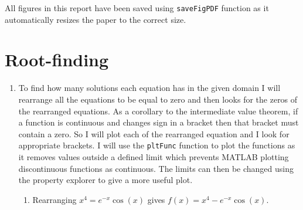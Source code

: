 \documentclass[a4paper,11pt]{article}
\begin{document}

All figures in this report have been saved using \verb*|saveFigPDF| function 
as it automatically resizes the paper to the correct size.


\section{Root-finding}
\begin{enumerate}
	\item To find how many solutions each equation has in the given domain I 
	will rearrange all the equations to be equal to zero and then looks for 
	the zeros of the rearranged equations. As a corollary to the intermediate 
	value theorem, if a function is continuous and changes sign in a bracket 
	then that bracket must contain a zero. So I will plot each of the 
	rearranged equation and I look for appropriate brackets. I will use the 
	\verb*|pltFunc| function to plot the functions as it removes values 
	outside a defined limit which prevents MATLAB plotting discontinuous 
	functions as continuous. The limits can then be changed using the 
	property explorer to give a more useful plot.
	
	\begin{enumerate}
		\item Rearranging $x^{4} = e^{-x} \cos(x)$ gives $f(x) = x^{4} - 
		e^{-x} \cos(x)$.
		
\end{enumerate}
\end{enumerate}
\end{document}
